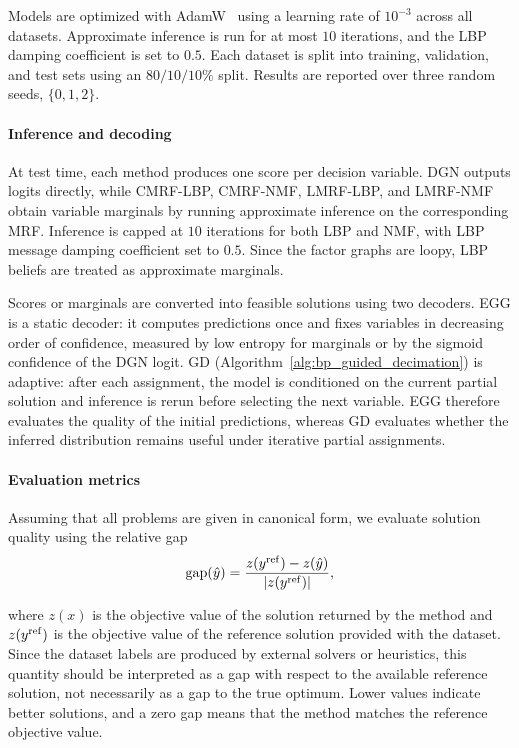 Models are optimized with AdamW~\citep{loshchilov_decoupled_2018-1} using a learning rate of $10^{-3}$ across all datasets. Approximate inference is run for at most $10$ iterations, and the LBP damping coefficient is set to $0.5$. Each dataset is split into training, validation, and test sets using an $80/10/10\%$ split. Results are reported over three random seeds, $\{0,1,2\}$.

\paragraph{Inference and decoding}
At test time, each method produces one score per decision variable. DGN outputs logits directly, while CMRF-LBP, CMRF-NMF, LMRF-LBP, and LMRF-NMF obtain variable marginals by running approximate inference on the corresponding MRF. Inference is capped at $10$ iterations for both LBP and NMF, with LBP message damping coefficient set to $0.5$. Since the factor graphs are loopy, LBP beliefs are treated as approximate marginals.

Scores or marginals are converted into feasible solutions using two decoders. EGG is a static decoder: it computes predictions once and fixes variables in decreasing order of confidence, measured by low entropy for marginals or by the sigmoid confidence of the DGN logit. GD (Algorithm~\ref{alg:bp_guided_decimation}) is adaptive: after each assignment, the model is conditioned on the current partial solution and inference is rerun before selecting the next variable. EGG therefore evaluates the quality of the initial predictions, whereas GD evaluates whether the inferred distribution remains useful under iterative partial assignments.

\paragraph{Evaluation metrics}
Assuming that all problems are given in canonical form, we evaluate solution quality using the relative gap
\begin{equation}
    \mathrm{gap}(\hat{y})
    =
    \frac{
        z(y^{\mathrm{ref}}) - z(\hat{y})
    }{
        |z(y^{\mathrm{ref}})|
    },
\end{equation}

where $z(x)$ is the objective value of the solution returned by the method and $z(y^{\mathrm{ref}})$ is the objective value of the reference solution provided with the dataset. Since the dataset labels are produced by external solvers or heuristics, this quantity should be interpreted as a gap with respect to the available reference solution, not necessarily as a gap to the true optimum. Lower values indicate better solutions, and a zero gap means that the method matches the reference objective value.

